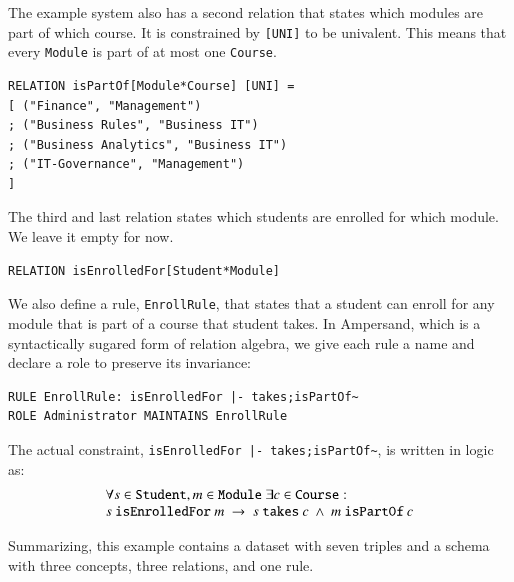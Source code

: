 \documentclass{elsarticle}
\begin{document}
   The example system also has a second relation that states which modules are part of which course.
   It is constrained by \verb-[UNI]- to be univalent.
   This means that every \verb-Module- is part of at most one \verb-Course-.
\begin{verbatim}
RELATION isPartOf[Module*Course] [UNI] =
[ ("Finance", "Management")
; ("Business Rules", "Business IT")
; ("Business Analytics", "Business IT")
; ("IT-Governance", "Management")
]
\end{verbatim}
   The third and last relation states which students are enrolled for which module.
   We leave it empty for now.
\begin{verbatim}
RELATION isEnrolledFor[Student*Module]
\end{verbatim}
   We also define a rule, {\tt EnrollRule}, that states that a student can enroll for any module that is part of a course that student takes.
   In Ampersand, which is a syntactically sugared form of relation algebra,
   we give each rule a name and declare a role to preserve its invariance:
\begin{verbatim}
RULE EnrollRule: isEnrolledFor |- takes;isPartOf~
ROLE Administrator MAINTAINS EnrollRule
\end{verbatim}
   The actual constraint, \verb#isEnrolledFor |- takes;isPartOf~#, is written in logic as:
\[\begin{array}{l}\forall s\in\text{\tt Student}, m\in\text{\tt Module}\ \exists c\in\text{\tt Course}:\\
s\ \text{\tt isEnrolledFor}\ m\ \rightarrow\ s\ \text{\tt takes}\ c\ \wedge\ m\ \text{\tt isPartOf}\ c
\end{array}\]

   Summarizing, this example contains a dataset with seven triples
   and a schema with three concepts, three relations, and one rule.
\end{document}
